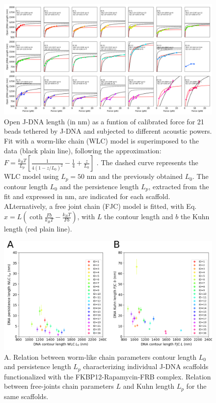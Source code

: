 \documentclass{biophys-new}
\begin{document}
\begin{figure}
	\centering
	\centerline {\includegraphics[width=1\linewidth]{Figures/Force_Lengths_Bis_Rapa.png}}
	\caption{Open J-DNA length (in nm) as a funtion of calibrated force for 21 beads tethered by J-DNA and subjected to different acoustic powers. Fit with a worm-like chain (WLC) model is superimposed to the data (black plain line), following the approximation: 
	$ F = \frac{k_B T}{L_p} \left[ \frac{1}{4(1-z/L_0)^2} - \frac{1}{4} + \frac{z}{L_0} \right] $ \cite{bouchiat1999}. The dashed curve represents the WLC model using $L_p=50$ nm and the previously obtained $L_0$.
	The contour length $L_0$ and the persistence length $L_p$, extracted from the fit and expressed in nm, are indicated for each scaffold. ALternatively, a free joint chain (FJC) model is fitted, with Eq. $x = L(\coth \frac{Fb}{k_B T} - \frac{k_B T}{Fb})$, with $L$ the contour length and $b$ the Kuhn length \cite{smith1992} (red plain line).}
	\label{fig:ForceLength}	
\end{figure}

\begin{figure}[hbt!]
	\centering
	\includegraphics[width=1\linewidth]{Figures/fig_WLC_FJC.png}
	\caption{A. Relation between worm-like chain parameters contour length $L_0$ and persistence length $L_p$ characterizing individual J-DNA scaffolds functionalized with the FKBP12-Rapamycin-FRB complex. Relation between free-joints chain parameters $L$ and Kuhn length $L_p$ for the same scaffolds. }
	\label{fig:Lp_vs_L0}	
\end{figure}
\end{document}
